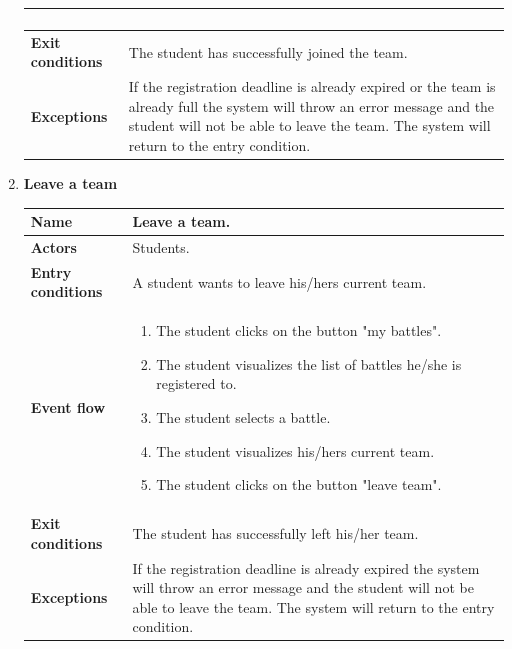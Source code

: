 \begin{enumerate}[label=\textbf{UC.\arabic*}]
\begin{table}[H]
\begin{tabular}{|m{3.2cm}|m{9.8cm}|}
\begin{enumerate}[label=\arabic*.]
                    \end{enumerate}\\ 
                    \hline
                    \textbf{Exit conditions}  & The student has successfully joined the team. \\
                    \hline
                    \textbf{Exceptions}  & If the registration deadline is already expired or the team is already full the system will throw an error message and the student will not be able to leave the team. The system will return to the entry condition. \\
                    \hline 
                \end{tabular}
        \end{table}
        \item {} \textbf{Leave a team}
        \begin{table}[H]
    	    \centering
                \renewcommand{\arraystretch}{1.5}
                \begin{tabular}{|m{3.2cm}|m{9.8cm}|}
                    \hline
                    \textbf{Name} & Leave a team. \\
                    \hline
                    \textbf{Actors} & Students. \\
                    \hline
                    \textbf{Entry conditions}  & A student wants to leave his/hers current team. \\
                    \hline
                    \textbf{Event flow}  & 
                    \begin{enumerate}[label=\arabic*.]
                        \item The student clicks on the button "my battles".
                        \item The student visualizes the list of battles he/she is registered to.
                        \item The student selects a battle.
                        \item The student visualizes his/hers current team.
                         \item The student clicks on the button "leave team".
                    \end{enumerate}\\ 
                    \hline
                    \textbf{Exit conditions}  & The student has successfully left his/her team. \\
                    \hline
                    \textbf{Exceptions}  & If the registration deadline is already expired the system will throw an error message and the student will not be able to leave the team. The system will return to the entry condition. \\

\end{tabular}
\end{table}
\end{enumerate}
